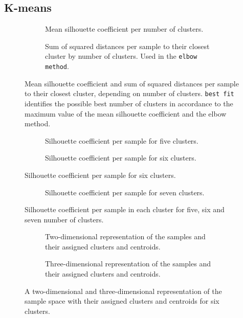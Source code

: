 \subsection{K-means}

\begin{figure}
	\begin{subfigure}[b]{\textwidth}
		
		\caption{Mean silhouette coefficient per number of clusters.}
	\end{subfigure}
	\begin{subfigure}[b]{\textwidth}
		
		\caption{Sum of squared distances per sample to their closest cluster by number of clusters. Used in the \texttt{elbow method}.}
	\end{subfigure}
	\caption{Mean silhouette coefficient and sum of squared distances per sample to their closest cluster, depending on number of clusters. \texttt{best fit} identifies the possible best number of clusters in accordance to the maximum value of the mean silhouette coefficient and the elbow method.}
	\label{fig:kmeans_score}
\end{figure}

\begin{figure}
	\begin{subfigure}[b]{\textwidth}
		
		\caption{Silhouette coefficient per sample for five clusters.}
	\end{subfigure}
	\begin{subfigure}[b]{\textwidth}
		
		\caption{Silhouette coefficient per sample for six clusters.}
		\label{fig:silhouette_6}
	\end{subfigure}
\end{figure}
\begin{figure}
	\ContinuedFloat
	\begin{subfigure}[b]{\textwidth}
		
		\caption{Silhouette coefficient per sample for seven clusters.}
	\end{subfigure}
	\caption{Silhouette coefficient per sample in each cluster for five, six and seven number of clusters.}
	\label{fig:silhouette_coef}
\end{figure}

\begin{figure}
	\begin{subfigure}[b]{\textwidth}
		
		\caption{Two-dimensional representation of the samples and their assigned clusters and centroids.}
	\end{subfigure}
	\begin{subfigure}[b]{\textwidth}
		
		\caption{Three-dimensional representation of the samples and their assigned clusters and centroids.}
	\end{subfigure}
	\caption{A two-dimensional and three-dimensional representation of the sample space with their assigned clusters and centroids for six clusters.}
	\label{fig:clusters}
\end{figure}


